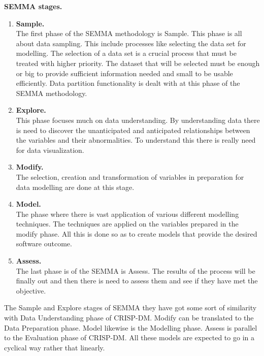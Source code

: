 \documentclass[12pt]{report}
\begin{document}
	\textbf{SEMMA stages.}\\
	
	\begin{enumerate}
		\item \textbf{Sample.}\\
		The first phase of the SEMMA methodology is Sample. This phase is all about data sampling. This include processes like selecting the data set for modelling. The selection of a data set is a crucial process that must be treated with higher priority.  The dataset that will be selected must be enough or big to provide sufficient information needed and small to be usable efficiently. Data partition functionality is dealt with at this phase of the SEMMA methodology.\\
		
		\item \textbf{Explore.}\\
		This phase focuses much on data understanding. By understanding data there is need to discover the unanticipated and anticipated relationships between the variables and their abnormalities. To understand this there is really need for data visualization.\\
		
		\item \textbf{Modify.}\\
		The selection, creation and transformation of variables in preparation for data modelling are done at this stage.\\
		
		\item \textbf{Model.}\\
		The phase where there is vast application of various different modelling techniques. The techniques are applied on the variables prepared in the modify phase. All this is done so as to create models that provide the desired software outcome.\\
		
		\item \textbf{Assess. }\\
		The last phase is of the SEMMA is Assess. The results of the process will be finally out and then there is need to assess them and see if they have met the objective.\\
	\end{enumerate}
The Sample and Explore stages of SEMMA they have got some sort of similarity with Data Understanding phase of CRISP-DM. Modify can be translated to the Data Preparation phase. Model likewise is the Modelling phase. Assess is parallel to the Evaluation phase of CRISP-DM. All these models are expected to go in a cyclical way rather that linearly.\\
	
\end{document}
